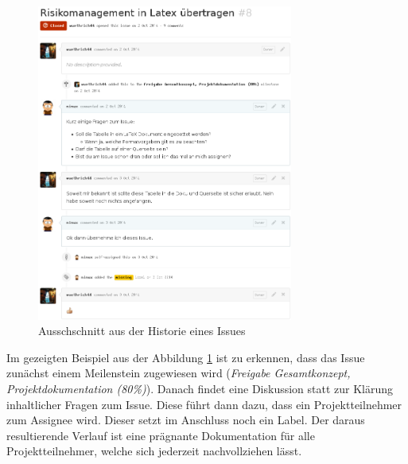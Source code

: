 \begin{figure}[h!]
	\centering
	\includegraphics[width=0.75\textwidth]{../../fig/github/issue_comment.png}
	\caption{Ausschschnitt aus der Historie eines Issues}
	\label{fig:comment}
\end{figure}

Im gezeigten Beispiel aus der Abbildung \ref{fig:comment} ist zu erkennen,
dass das \gls{Issue} zunächst einem Meilenstein zugewiesen wird
(\emph{Freigabe Gesamtkonzept, Projektdokumentation (80\%)}). Danach findet
eine Diskussion statt zur Klärung inhaltlicher Fragen zum \gls{Issue}. Diese
führt dann dazu, dass ein Projektteilnehmer zum \gls{Assignee} wird. Dieser
setzt im Anschluss noch ein \gls{Label}. Der daraus resultierende Verlauf ist
eine prägnante Dokumentation für alle Projektteilnehmer, welche sich
jederzeit nachvollziehen lässt.
